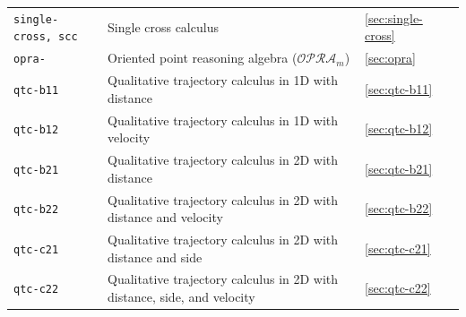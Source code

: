 \documentclass[headsepline]{scrreprt}
\theoremstyle{definition}
\newcommand{\opra}{$\mathcal{OPRA}_m$}
\begin{document}
\begin{center}
\begin{longtable}{|p{4cm}p{6cm}ll|}
	{\tt single-cross, scc} & Single cross calculus \citep{cosyfre92} & \ref{sec:single-cross} & \pageref{sec:single-cross} \\
	{\tt opra-} & Oriented point reasoning algebra (\opra{})\citep{moratz06_opra} & \ref{sec:opra} & \pageref{sec:opra}\\
	{\tt qtc-b11} & Qualitative trajectory calculus in 1D with distance \citep{Weghe04_PhD} & \ref{sec:qtc-b11} & \pageref{sec:qtc-b11}\\
	{\tt qtc-b12} & Qualitative trajectory calculus in 1D with velocity \citep{Weghe04_PhD} & \ref{sec:qtc-b12} & \pageref{sec:qtc-b12}\\
	{\tt qtc-b21} & Qualitative trajectory calculus in 2D with distance \citep{Weghe04_PhD} & \ref{sec:qtc-b21} & \pageref{sec:qtc-b21}\\
	{\tt qtc-b22} & Qualitative trajectory calculus in 2D with distance and velocity \citep{Weghe04_PhD} & \ref{sec:qtc-b22} & \pageref{sec:qtc-b22}\\
	{\tt qtc-c21} & Qualitative trajectory calculus in 2D with distance and side \citep{Weghe04_PhD} & \ref{sec:qtc-c21} & \pageref{sec:qtc-c21}\\
	{\tt qtc-c22} & Qualitative trajectory calculus in 2D with distance, side, and velocity \citep{Weghe04_PhD} & \ref{sec:qtc-c22} & \pageref{sec:qtc-c22}\\
	\hline
\end{longtable}
\end{center}
\renewcommand{\arraystretch}{1.0}
\end{document}
